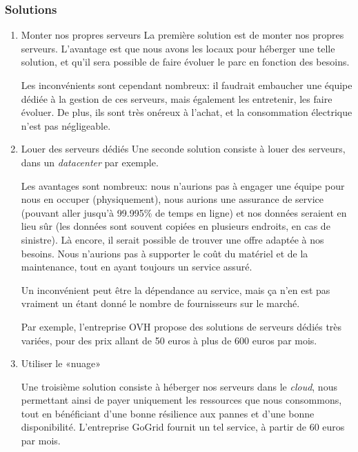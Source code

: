     \subsubsection{Solutions}
        \begin{enumerate}
            \item Monter nos propres serveurs
            La première solution est de monter nos propres serveurs.
            L'avantage est que nous avons les locaux pour héberger une
            telle solution, et qu'il sera possible de faire évoluer
            le parc en fonction des besoins.
    
            Les inconvénients sont cependant nombreux: il faudrait
            embaucher une équipe dédiée à la gestion de ces serveurs,
            mais également les entretenir,
            les faire évoluer. De plus, ils sont très onéreux à l'achat,
            et la consommation électrique n'est pas négligeable.
            
            \item Louer des serveurs dédiés
            Une seconde solution consiste à louer des serveurs,
            dans un \textsl{datacenter} par exemple.

            Les avantages sont nombreux: nous n'aurions pas
            à engager une équipe pour
            nous en occuper (physiquement), nous aurions une
            assurance de service
            (pouvant aller jusqu'à 99.995\% de temps en ligne)
            et nos données seraient
            en lieu sûr (les données sont souvent copiées en
            plusieurs endroits, en cas de sinistre). Là encore,
            il serait possible de trouver une offre adaptée à nos besoins.
            Nous n'aurions pas à supporter le coût du matériel et de la 
            maintenance, tout en ayant toujours un service assuré.

            Un inconvénient peut être la dépendance au service, mais ça
            n'en est pas vraiment un étant donné le nombre de
            fournisseurs sur le marché.

            Par exemple, l'entreprise OVH propose des solutions
            de serveurs dédiés très variées, pour des prix allant
            de 50 euros à plus de 600 euros par mois.

            \item Utiliser le «nuage»

            Une troisième solution consiste à héberger nos serveurs
            dans le \textsl{cloud}, nous permettant ainsi de payer
            uniquement les ressources que nous consommons, tout
            en bénéficiant d'une bonne résilience aux pannes et 
            d'une bonne disponibilité.
            L'entreprise GoGrid fournit un tel service, à partir de
            60 euros par mois. 
            

        \end{enumerate}
